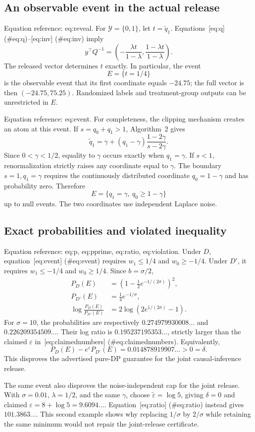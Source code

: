 \documentclass[10pt]{article}
\begin{document}
\subsection*{An observable event in the actual release}
Equation reference: eq:reveal. For \(\mathcal Y=\{0,1\}\), let \(t=\widetilde q_1\). Equations [eq:q] (\#eq:q)–[eq:inv] (\#eq:inv) imply \[
 y^\top Q^{-1}
 =\left(-\frac{\lambda t}{1-\lambda},
             \frac{1-\lambda t}{1-\lambda}\right).\] The released vector determines \(t\) exactly. In particular, the event \[E=\{t=1/4\}\] is the observable event that its first coordinate equals \(-24.75\); the full vector is then \((-24.75,75.25)\). Randomized labels and treatment-group outputs can be unrestricted in \(E\).\par
Equation reference: eq:event. For completeness, the clipping mechanism creates an atom at this event. If \(s=q_0+q_1>1\), Algorithm 2 gives \[\widetilde q_1=\gamma+(q_1-\gamma)
                    \frac{1-2\gamma}{s-2\gamma}.\] Since \(0<\gamma<1/2\), equality to \(\gamma\) occurs exactly when \(q_1=\gamma\). If \(s<1\), renormalization strictly raises any coordinate equal to \(\gamma\). The boundary \(s=1,q_1=\gamma\) requires the continuously distributed coordinate \(q_0=1-\gamma\) and has probability zero. Therefore \[
 E=\{q_1=\gamma,\ q_0\ge1-\gamma\}\] up to null events. The two coordinates use independent Laplace noise.\par
\subsection*{Exact probabilities and violated inequality}
Equation reference: eq:p, eq:pprime, eq:ratio, eq:violation. Under \(D\), equation [eq:event] (\#eq:event) requires \(w_1\le1/4\) and \(w_0\ge-1/4\). Under \(D'\), it requires \(w_1\le-1/4\) and \(w_0\ge1/4\). Since \(b=\sigma/2\), \[\begin{aligned}
 P_D(E)&=\left(1-\frac12e^{-1/(2\sigma)}\right)^2,
 \\
 P_{D'}(E)&=\frac14e^{-1/\sigma},
 \\
 \log\frac{P_D(E)}{P_{D'}(E)}
 &=2\log\left(2e^{1/(2\sigma)}-1\right).
 \end{aligned}\] For \(\sigma=10\), the probabilities are respectively \(0.274979930008\ldots\) and \(0.226209354509\ldots\). Their log ratio is \(0.195237195353\ldots\), strictly larger than the claimed \(\varepsilon\) in [eq:claimednumbers] (\#eq:claimednumbers). Equivalently, \[
 P_D(E)-e^\varepsilon P_{D'}(E)
 =0.014878919907\ldots>0=\delta.\] This disproves the advertised pure-DP guarantee for the joint causal-inference release.\par
The same event also disproves the noise-independent cap for the joint release. With \(\sigma=0.01\), \(\lambda=1/2\), and the same \(\gamma\), choose \(\widetilde\varepsilon=\log5\), giving \(\delta=0\) and claimed \(\varepsilon=8+\log5=9.6094\ldots\). Equation [eq:ratio] (\#eq:ratio) instead gives \(101.3863\ldots\). This second example shows why replacing \(1/\sigma\) by \(2/\sigma\) while retaining the same minimum would not repair the joint-release certificate.\par
\end{document}
